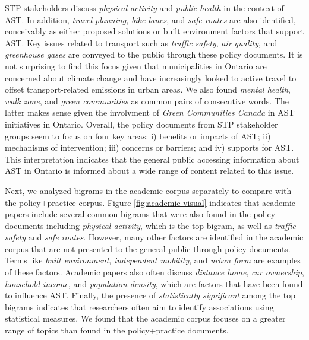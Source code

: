 \documentclass[preprint, 3p,
authoryear]{elsarticle} %
\begin{document}
STP stakeholders discuss \emph{physical activity} and \emph{public
health} in the context of AST. In addition, \emph{travel planning},
\emph{bike lanes}, and \emph{safe routes} are also identified,
conceivably as either proposed solutions or built environment factors
that support AST. Key issues related to transport such as \emph{traffic
safety}, \emph{air quality}, and \emph{greenhouse gases} are conveyed to
the public through these policy documents. It is not surprising to find
this focus given that municipalities in Ontario are concerned about
climate change and have increasingly looked to active travel to offset
transport-related emissions in urban areas. We also found \emph{mental
health}, \emph{walk zone}, and \emph{green communities} as common pairs
of consecutive words. The latter makes sense given the involvment of
\emph{Green Communities Canada} in AST initiatives in Ontario. Overall,
the policy documents from STP stakeholder groups seem to focus on four
key areas: i) benefits or impacts of AST; ii) mechanisms of
intervention; iii) concerns or barriers; and iv) supports for AST. This
interpretation indicates that the general public accessing information
about AST in Ontario is informed about a wide range of content related
to this issue.

Next, we analyzed bigrams in the academic corpus separately to compare
with the policy+practice corpus. Figure \ref{fig:academic-visual}
indicates that academic papers include several common bigrams that were
also found in the policy documents including \emph{physical activity},
which is the top bigram, as well as \emph{traffic safety} and \emph{safe
routes}. However, many other factors are identified in the academic
corpus that are not presented to the general public through policy
documents. Terms like \emph{built environment}, \emph{independent
mobility}, and \emph{urban form} are examples of these factors. Academic
papers also often discuss \emph{distance home}, \emph{car ownership},
\emph{household income}, and \emph{population density}, which are
factors that have been found to influence AST. Finally, the presence of
\emph{statistically significant} among the top bigrams indicates that
researchers often aim to identify associations using statistical
measures. We found that the academic corpus focuses on a greater range
of topics than found in the policy+practice documents.
\end{document}
